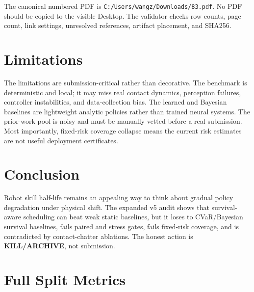 \documentclass{article}
\begin{document}
The canonical numbered PDF is \texttt{C:/Users/wangz/Downloads/83.pdf}. No PDF should be copied to the visible Desktop. The validator checks row counts, page count, link settings, unresolved references, artifact placement, and SHA256.

\section{Limitations}

The limitations are submission-critical rather than decorative. The benchmark is deterministic and local; it may miss real contact dynamics, perception failures, controller instabilities, and data-collection bias. The learned and Bayesian baselines are lightweight analytic policies rather than trained neural systems. The prior-work pool is noisy and must be manually vetted before a real submission. Most importantly, fixed-risk coverage collapse means the current risk estimates are not useful deployment certificates.

\section{Conclusion}

Robot skill half-life remains an appealing way to think about gradual policy degradation under physical shift. The expanded v5 audit shows that survival-aware scheduling can beat weak static baselines, but it loses to CVaR/Bayesian survival baselines, fails paired and stress gates, fails fixed-risk coverage, and is contradicted by contact-chatter ablations. The honest action is \textbf{KILL/ARCHIVE}, not submission.

\appendix

\section{Full Split Metrics}
\end{document}

